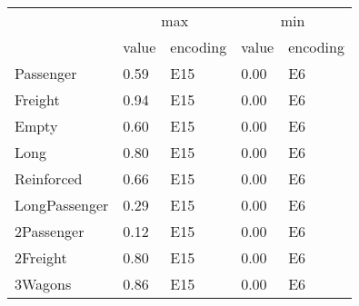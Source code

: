 \begin{tabular}{lllll}
\toprule
 & \multicolumn{2}{c}{max} & \multicolumn{2}{c}{min} \\
 & value & encoding & value & encoding \\
\midrule
Passenger & 0.59 & E15 & 0.00 & E6 \\
Freight & 0.94 & E15 & 0.00 & E6 \\
Empty & 0.60 & E15 & 0.00 & E6 \\
Long & 0.80 & E15 & 0.00 & E6 \\
Reinforced & 0.66 & E15 & 0.00 & E6 \\
LongPassenger & 0.29 & E15 & 0.00 & E6 \\
2Passenger & 0.12 & E15 & 0.00 & E6 \\
2Freight & 0.80 & E15 & 0.00 & E6 \\
3Wagons & 0.86 & E15 & 0.00 & E6 \\
\bottomrule
\end{tabular}
